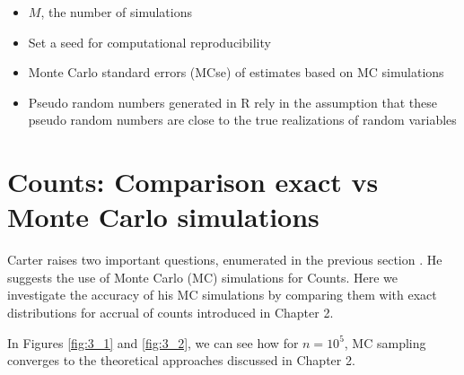 \begin{itemize}
\item $M$, the number of simulations
\item Set a seed for computational reproducibility
\item Monte Carlo standard errors (MCse) of estimates based on MC simulations
\item Pseudo random numbers generated in R rely in the assumption that these pseudo random numbers are close to the true realizations of random variables \citep{held2014applied}
\end{itemize}
\section{Counts: Comparison exact vs Monte Carlo simulations}

Carter raises two important questions, enumerated in the previous section \citep{carter2004application, carter2005practical}. He suggests the use of Monte Carlo (MC) simulations for Counts. Here we investigate the accuracy of his MC simulations by comparing them with exact distributions for accrual of counts introduced in Chapter 2. 

In Figures \ref{fig:3_1} and \ref{fig:3_2}, we can see how for $n=10^5$, MC sampling converges to the theoretical approaches discussed in Chapter 2.





% 
% 
% 
% 
% 

